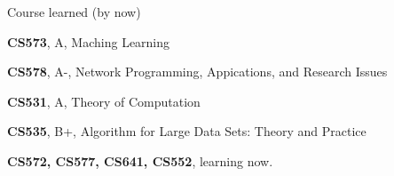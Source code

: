 
\begin{cventries}

  \cventry
    {Course learned (by now)} %
    {} %
    {} %
    {} %
    {
      \begin{cvitems}
        \item \textbf{CS573}, A,  Maching Learning
        \item \textbf{CS578}, A-, Network Programming, Appications, and Research Issues
        \item \textbf{CS531}, A,  Theory of Computation
        \item \textbf{CS535}, B+, Algorithm for Large Data Sets: Theory and Practice
        \item \textbf{CS572, CS577, CS641, CS552}, learning now.
      \end{cvitems}
    }

\end{cventries}
